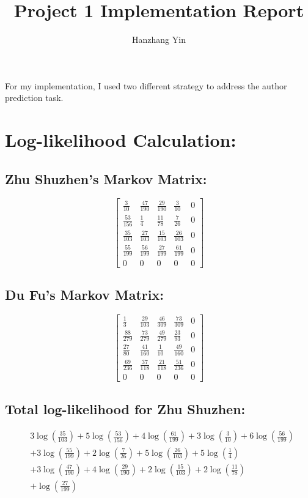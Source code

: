 \documentclass[12pt]{article}
\title{\vspace{-2cm}Project 1 Implementation Report}
\author{Hanzhang Yin}
\begin{document}
\maketitle

\noindent For my implementation, I used two different strategy to address the author prediction task.

\section*{Log-likelihood Calculation: }

\subsection*{Zhu Shuzhen's Markov Matrix:}
\[
\begin{bmatrix}
\frac{3}{10} & \frac{47}{190} & \frac{29}{190} & \frac{3}{10} & 0 \\
\frac{53}{156} & \frac{1}{4} & \frac{11}{78} & \frac{7}{26} & 0 \\
\frac{35}{103} & \frac{27}{103} & \frac{15}{103} & \frac{26}{103} & 0 \\
\frac{55}{199} & \frac{56}{199} & \frac{27}{199} & \frac{61}{199} & 0 \\
0 & 0 & 0 & 0 & 0
\end{bmatrix}
\]

\subsection*{Du Fu's Markov Matrix:}
\[
\begin{bmatrix}
\frac{1}{3} & \frac{29}{103} & \frac{46}{309} & \frac{73}{309} & 0 \\
\frac{88}{279} & \frac{73}{279} & \frac{49}{279} & \frac{23}{93} & 0 \\
\frac{27}{80} & \frac{41}{160} & \frac{1}{10} & \frac{49}{160} & 0 \\
\frac{69}{236} & \frac{37}{118} & \frac{21}{118} & \frac{51}{236} & 0 \\
0 & 0 & 0 & 0 & 0
\end{bmatrix}
\]

\subsection*{Total log-likelihood for Zhu Shuzhen:}
\[
\begin{aligned}
    &3\log\left(\frac{35}{103}\right) + 5\log\left(\frac{53}{156}\right) + 4\log\left(\frac{61}{199}\right) + 3\log\left(\frac{3}{10}\right) + 6\log\left(\frac{56}{199}\right) \\
    &+ 3\log\left(\frac{55}{199}\right) + 2\log\left(\frac{7}{26}\right) + 5\log\left(\frac{26}{103}\right) + 5\log\left(\frac{1}{4}\right) \\
    &+ 3\log\left(\frac{47}{190}\right) + 4\log\left(\frac{29}{190}\right) + 2\log\left(\frac{15}{103}\right) + 2\log\left(\frac{11}{78}\right) \\
    &+ \log\left(\frac{27}{199}\right)
\end{aligned}
\]
\end{document}
